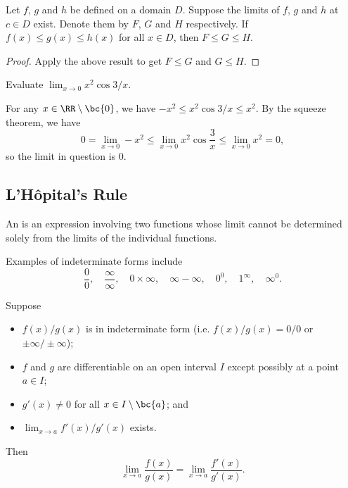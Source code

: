 \begin{theorem}
    Let $f$, $g$ and $h$ be defined on a domain $D$. Suppose the limits of $f$, $g$ and $h$ at $c \in D$ exist. Denote them by $F$, $G$ and $H$ respectively. If $f(x) \leq g(x) \leq h(x)$ for all $x \in D$, then $F \leq G \leq H$.
\end{theorem}
\begin{proof}
    Apply the above result to get $F \leq G$ and $G \leq H$.
\end{proof}

\begin{sample}
    Evaluate $\lim_{x \to 0} x^2 \cos{3/x}$.
\end{sample}
\begin{sampans}
    For any $x \in \RR\setminus\bc{0}$, we have $-x^2 \leq x^2 \cos{3/x} \leq x^2$. By the squeeze theorem, we have \[0 = \lim_{x \to 0} -x^2 \leq \lim_{x \to 0} x^2 \cos{\frac3x} \leq \lim_{x \to 0} x^2 = 0,\] so the limit in question is 0.
\end{sampans}

\subsection{L'H\^{o}pital's Rule}

\begin{definition}
    An  is an expression involving two functions whose limit cannot be determined solely from the limits of the individual functions.
\end{definition}

Examples of indeterminate forms include \[\frac{0}{0}, \quad \frac{\infty}{\infty}, \quad 0 \times \infty, \quad \infty - \infty, \quad 0^0, \quad 1^\infty, \quad \infty^0.\]

\begin{theorem}
    Suppose
    \begin{itemize}
        \item $f(x)/g(x)$ is in indeterminate form (i.e. $f(x)/g(x) = 0/0$ or $\pm \infty/\pm \infty$);
        \item $f$ and $g$ are differentiable on an open interval $I$ except possibly at a point $a \in I$;
        \item $g'(x) \neq 0$ for all $x \in I \setminus \bc{a}$; and
        \item $\lim_{x \to a} f'(x)/g'(x)$ exists.
    \end{itemize}
    Then \[\lim_{x \to a} \frac{f(x)}{g(x)} = \lim_{x \to a} \frac{f'(x)}{g'(x)}.\]
\end{theorem}

